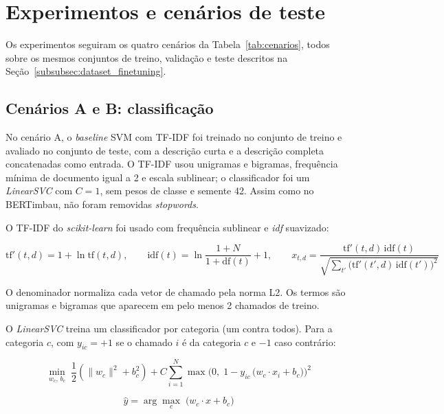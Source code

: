 \documentclass[
    12pt,                %
    openright,           %
    oneside,             %
    a4paper,             %
    english,             %
    brazil               %
]{abntex2}
\begin{document}
\section{Experimentos e cenários de teste}
\label{sec:experimentos}

Os experimentos seguiram os quatro cenários da Tabela~\ref{tab:cenarios}, todos sobre os mesmos conjuntos de treino, validação e teste descritos na Seção~\ref{subsubsec:dataset_finetuning}.

\subsection{Cenários A e B: classificação}

No cenário A, o \textit{baseline} SVM com TF-IDF foi treinado no conjunto de treino e avaliado no conjunto de teste, com a descrição curta e a descrição completa concatenadas como entrada. O TF-IDF usou unigramas e bigramas, frequência mínima de documento igual a 2 e escala sublinear; o classificador foi um \textit{LinearSVC} com $C = 1$, sem pesos de classe e semente 42. Assim como no BERTimbau, não foram removidas \textit{stopwords}.

O TF-IDF do \textit{scikit-learn} foi usado com frequência sublinear e \textit{idf} suavizado:

\begin{equation}
\mathrm{tf}'(t,d) = 1 + \ln \mathrm{tf}(t,d), \qquad
\mathrm{idf}(t) = \ln \frac{1 + N}{1 + \mathrm{df}(t)} + 1, \qquad
x_{t,d} = \frac{\mathrm{tf}'(t,d)\,\mathrm{idf}(t)}{\sqrt{\sum_{t'} \big(\mathrm{tf}'(t',d)\,\mathrm{idf}(t')\big)^2}}
\label{eq:tfidf-sklearn}
\end{equation}

O denominador normaliza cada vetor de chamado pela norma L2. Os termos são unigramas e bigramas que aparecem em pelo menos 2 chamados de treino.

O \textit{LinearSVC} treina um classificador por categoria (um contra todos). Para a categoria $c$, com $y_{ic} = +1$ se o chamado $i$ é da categoria $c$ e $-1$ caso contrário:

\begin{equation}
\min_{w_c,\, b_c} \; \frac{1}{2} \left( \lVert w_c \rVert^2 + b_c^2 \right)
+ C \sum_{i=1}^{N} \max\!\Big( 0,\; 1 - y_{ic}\,\big(w_c \cdot x_i + b_c\big) \Big)^2
\label{eq:svm}
\end{equation}

\begin{equation}
\hat{y} = \arg\max_{c} \; \big( w_c \cdot x + b_c \big)
\label{eq:svm-decisao}
\end{equation}
\end{document}
